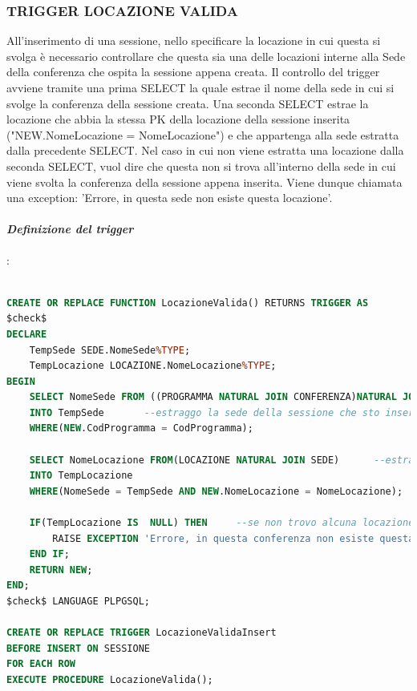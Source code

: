 \documentclass[a4page]{article}
\begin{document}
\subsubsection{TRIGGER LOCAZIONE VALIDA}
All'inserimento di una sessione, nello specificare la locazione in cui questa si svolga è necessario controllare che questa sia una delle locazioni interne alla Sede della conferenza che ospita la sessione appena creata. Il controllo del trigger avviene tramite una prima SELECT la quale estrae il nome della sede in cui si svolge la conferenza della sessione creata. Una seconda SELECT estrae la locazione che abbia la stessa PK della locazione della sessione inserita ("NEW.NomeLocazione = NomeLocazione") e che appartenga alla sede estratta dalla precedente SELECT. Nel caso in cui non viene estratta una locazione dalla seconda SELECT, vuol dire che questa non si trova all'interno della sede in cui viene svolta la conferenza della sessione appena inserita.
Viene dunque chiamata una exception: 'Errore, in questa sede non esiste questa locazione'.
\vspace{1cm}
\paragraph{\textit{Definizione del trigger}}:
\begin{lstlisting}[language=SQL,
        deletekeywords={IDENTITY,INT},
        morekeywords={clustered},    
        framesep=10pt,
        framextopmargin=10pt]

CREATE OR REPLACE FUNCTION LocazioneValida() RETURNS TRIGGER AS
$check$
DECLARE
	TempSede SEDE.NomeSede%TYPE;
	TempLocazione LOCAZIONE.NomeLocazione%TYPE;
BEGIN
	SELECT NomeSede FROM ((PROGRAMMA NATURAL JOIN CONFERENZA)NATURAL JOIN SEDE)
	INTO TempSede		--estraggo la sede della sessione che sto inserendo
	WHERE(NEW.CodProgramma = CodProgramma);
	
	SELECT NomeLocazione FROM(LOCAZIONE NATURAL JOIN SEDE)		--estraggo la locazione che potrebbe dare conflitto 
	INTO TempLocazione
	WHERE(NomeSede = TempSede AND NEW.NomeLocazione = NomeLocazione);
	
	IF(TempLocazione IS  NULL) THEN		--se non trovo alcuna locazione, allora questa non esiste in quella sede
		RAISE EXCEPTION 'Errore, in questa conferenza non esiste questa locazione';
	END IF;
	RETURN NEW;
END;
$check$ LANGUAGE PLPGSQL;	

CREATE OR REPLACE TRIGGER LocazioneValidaInsert
BEFORE INSERT ON SESSIONE
FOR EACH ROW
EXECUTE PROCEDURE LocazioneValida();        
\end{lstlisting}
\newpage
\end{document}
